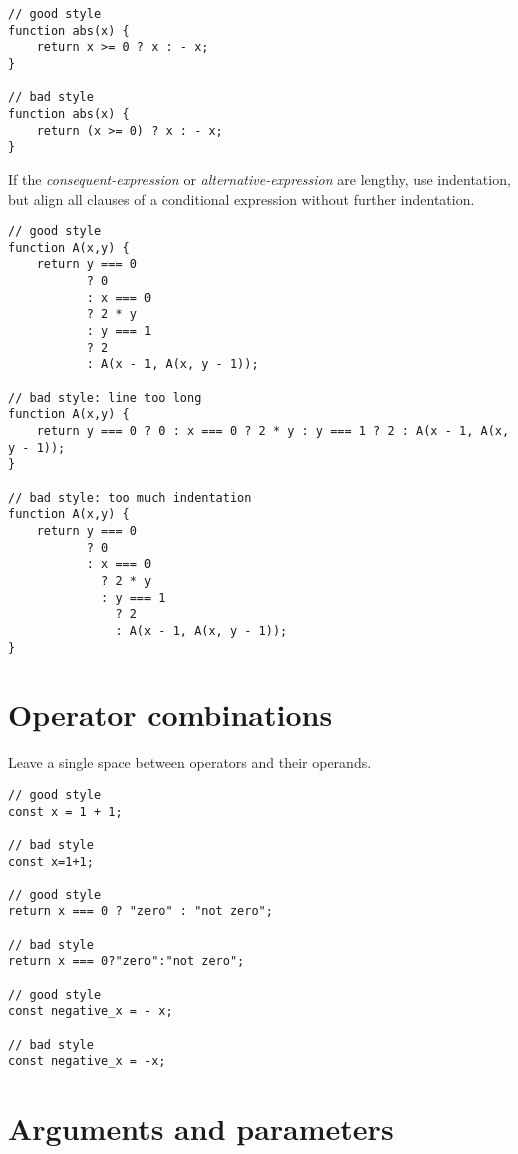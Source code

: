 \begin{lstlisting}
// good style
function abs(x) {
    return x >= 0 ? x : - x;
}

// bad style
function abs(x) {
    return (x >= 0) ? x : - x;
}
\end{lstlisting}

If the \textit{consequent-expression} or \textit{alternative-expression} are lengthy, use
indentation, but align all clauses of a conditional expression without further indentation.
%
\begin{lstlisting}
// good style
function A(x,y) {
    return y === 0
           ? 0
           : x === 0
           ? 2 * y
           : y === 1
           ? 2
           : A(x - 1, A(x, y - 1));

// bad style: line too long
function A(x,y) {
    return y === 0 ? 0 : x === 0 ? 2 * y : y === 1 ? 2 : A(x - 1, A(x, y - 1));
}

// bad style: too much indentation
function A(x,y) {
    return y === 0
           ? 0
           : x === 0
             ? 2 * y
             : y === 1
               ? 2
               : A(x - 1, A(x, y - 1));
}
\end{lstlisting}

\vspace{-4mm}

\section*{Operator combinations}

Leave a single space between operators and their operands.
	
\begin{lstlisting}
// good style
const x = 1 + 1;

// bad style
const x=1+1;

// good style
return x === 0 ? "zero" : "not zero";

// bad style
return x === 0?"zero":"not zero";

// good style
const negative_x = - x;

// bad style
const negative_x = -x;
\end{lstlisting}

\vspace{-4mm}

\section*{Arguments and parameters}

